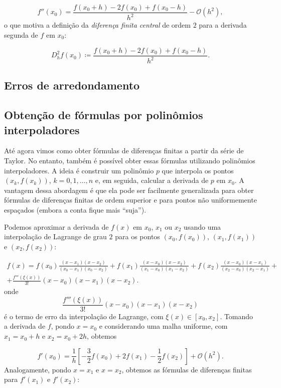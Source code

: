 \documentclass{article}
\begin{document}
\begin{equation}
    f''(x_0) = \frac{f(x_0+h) - 2f(x_0) + f(x_0-h)}{h^2} - \mathcal{O}(h^2),
\end{equation}
o que motiva a definição da \emph{diferença finita central} de ordem \(2\) para a derivada segunda de \(f\) em \(x_0\):

\begin{equation}
    D^2_h f(x_0) \coloneq \frac{f(x_0+h) - 2f(x_0) + f(x_0-h)}{h^2}.
\end{equation}

\subsection{Erros de arredondamento}

\subsection{Obtenção de fórmulas por polinômios interpoladores}

Até agora vimos como obter fórmulas de diferenças finitas a partir da série de Taylor. No entanto, também é possível obter essas fórmulas utilizando polinômios interpoladores. A ideia é construir um polinômio \(p\) que interpola os pontos \((x_k, f(x_k))\), \(k = 0, 1, \ldots, n\) e, em seguida, calcular a derivada de \(p\) em \(x_0\). A vantagem dessa abordagem é que ela pode ser facilmente generalizada para obter fórmulas de diferenças finitas de ordem superior e para pontos não uniformemente espaçados (embora a conta fique mais ``suja'').

Podemos aproximar a derivada de \(f(x)\) em \(x_0\), \(x_1\) ou \(x_2\) usando uma interpolação de Lagrange de grau \(2\) para os pontos \((x_0, f(x_0))\), \((x_1, f(x_1))\) e \((x_2, f(x_2))\):

\begin{multline}
    f(x) = f(x_0) \frac{(x-x_1)(x-x_2)}{(x_0-x_1)(x_0-x_2)} + f(x_1) \frac{(x-x_0)(x-x_2)}{(x_1-x_0)(x_1-x_2)} + f(x_2) \frac{(x-x_0)(x-x_1)}{(x_2-x_0)(x_2-x_1)} + \\
    + \frac{f'''(\xi(x))}{3!}(x-x_0)(x-x_1)(x-x_2).
\end{multline}
onde
\[
    \frac{f'''(\xi(x))}{3!}(x-x_0)(x-x_1)(x-x_2)
\]
é o termo de erro da interpolação de Lagrange, com \(\xi(x) \in [x_0, x_2]\). Tomando a derivada de \(f\), pondo \(x=x_0\) e considerando uma malha uniforme, com \(x_1 = x_0 + h\) e \(x_2 = x_0 + 2h\), obtemos

\begin{equation}
    f'(x_0) = \frac{1}{h} \left[ -\frac{3}{2}f(x_0) + 2f(x_1) - \frac{1}{2}f(x_2) \right] + \mathcal{O}(h^2).
\end{equation}
Analogamente, pondo \(x = x_1\) e \(x = x_2\), obtemos as fórmulas de diferenças finitas para \(f'(x_1)\) e \(f'(x_2)\):
\end{document}
